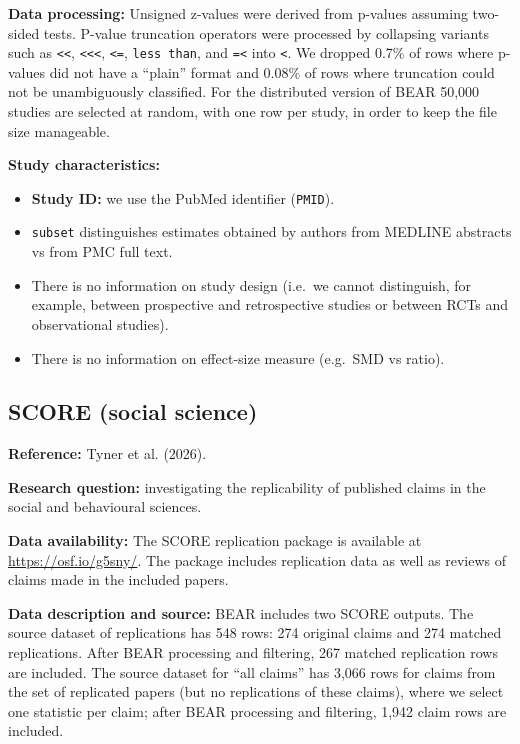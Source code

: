 \documentclass[
  11pt,
]{article}
\providecommand{\tightlist}{%
  \setlength{\itemsep}{0pt}\setlength{\parskip}{0pt}}
\begin{document}
\textbf{Data processing:} Unsigned z-values were derived from p-values
assuming two-sided tests. P-value truncation operators were processed by
collapsing variants such as \texttt{\textless{}\textless{}},
\texttt{\textless{}\textless{}\textless{}}, \texttt{\textless{}=},
\texttt{less\ than}, and \texttt{=\textless{}} into
\texttt{\textless{}}. We dropped 0.7\% of rows where p-values did not
have a ``plain'' format and 0.08\% of rows where truncation could not be
unambiguously classified. For the distributed version of BEAR 50,000
studies are selected at random, with one row per study, in order to keep
the file size manageable.

\textbf{Study characteristics:}

\begin{itemize}
\tightlist
\item
  \textbf{Study ID:} we use the PubMed identifier (\texttt{PMID}).
\item
  \texttt{subset} distinguishes estimates obtained by authors from
  MEDLINE abstracts vs from PMC full text.
\item
  There is no information on study design (i.e.~we cannot distinguish,
  for example, between prospective and retrospective studies or between
  RCTs and observational studies).
\item
  There is no information on effect-size measure (e.g.~SMD vs ratio).
\end{itemize}

\newpage

\subsection{SCORE (social science)}\label{score-social-science}

\textbf{Reference:} {Tyner et al.} (2026).

\textbf{Research question:} investigating the replicability of published
claims in the social and behavioural sciences.

\textbf{Data availability:} The SCORE replication package is available
at \url{https://osf.io/g5sny/}. The package includes replication data as
well as reviews of claims made in the included papers.

\textbf{Data description and source:} BEAR includes two SCORE outputs.
The source dataset of replications has 548 rows: 274 original claims and
274 matched replications. After BEAR processing and filtering, 267
matched replication rows are included. The source dataset for ``all
claims'' has 3,066 rows for claims from the set of replicated papers
(but no replications of these claims), where we select one statistic per
claim; after BEAR processing and filtering, 1,942 claim rows are
included.
\end{document}
